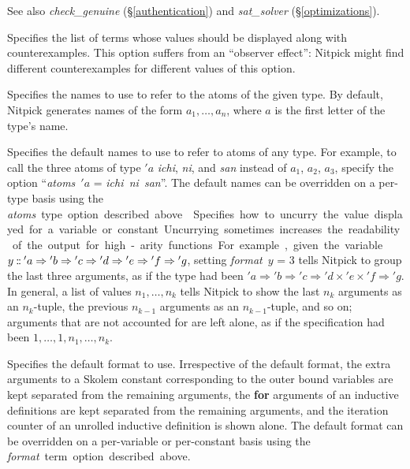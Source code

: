 \documentclass[a4paper,12pt]{article}
\def\Colon{\mathord{:\mkern-1.5mu:}}
\begin{document}
\begin{enum}
\nopagebreak
{\small See also \textit{check\_genuine} (\S\ref{authentication}) and
\textit{sat\_solver} (\S\ref{optimizations}).}

Specifies the list of terms whose values should be displayed along with
counterexamples. This option suffers from an ``observer effect'': Nitpick might
find different counterexamples for different values of this option.

Specifies the names to use to refer to the atoms of the given type. By default,
Nitpick generates names of the form $a_1, \ldots, a_n$, where $a$ is the first
letter of the type's name.

Specifies the default names to use to refer to atoms of any type. For example,
to call the three atoms of type ${'}a$ \textit{ichi}, \textit{ni}, and
\textit{san} instead of $a_1$, $a_2$, $a_3$, specify the option
``\textit{atoms}~${'}a$ = \textit{ichi~ni~san}''. The default names can be
overridden on a per-type basis using the \textit{atoms}~\qty{type} option
described above.

Specifies how to uncurry the value displayed for a variable or constant.
Uncurrying sometimes increases the readability of the output for high-arity
functions. For example, given the variable $y \mathbin{\Colon} {'a}\Rightarrow
{'b}\Rightarrow {'c}\Rightarrow {'d}\Rightarrow {'e}\Rightarrow {'f}\Rightarrow
{'g}$, setting \textit{format}~$y$ = 3 tells Nitpick to group the last three
arguments, as if the type had been ${'a}\Rightarrow {'b}\Rightarrow
{'c}\Rightarrow {'d}\times {'e}\times {'f}\Rightarrow {'g}$. In general, a list
of values $n_1,\ldots,n_k$ tells Nitpick to show the last $n_k$ arguments as an
$n_k$-tuple, the previous $n_{k-1}$ arguments as an $n_{k-1}$-tuple, and so on;
arguments that are not accounted for are left alone, as if the specification had
been $1,\ldots,1,n_1,\ldots,n_k$.

Specifies the default format to use. Irrespective of the default format, the
extra arguments to a Skolem constant corresponding to the outer bound variables
are kept separated from the remaining arguments, the \textbf{for} arguments of
an inductive definitions are kept separated from the remaining arguments, and
the iteration counter of an unrolled inductive definition is shown alone. The
default format can be overridden on a per-variable or per-constant basis using
the \textit{format}~\qty{term} option described above.
\end{enum}
\end{document}
